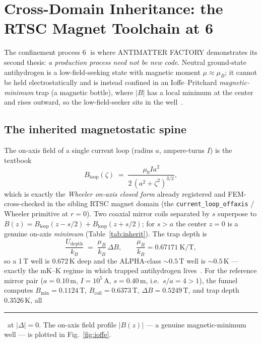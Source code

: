 \documentclass[11pt,a4paper]{article}
\newcommand{\tierdisc}[1]{\textcolor{#1}{\rule[0.05ex]{1.0ex}{1.0ex}}}
\newcommand{\tierGreen}{\tierdisc{green!60!black}}
\begin{document}
\section{Cross-Domain Inheritance: the RTSC Magnet Toolchain at \textcircled{\scriptsize 6}}
\label{sec:inherit}

The confinement process \textcircled{\scriptsize 6} is where ANTIMATTER
FACTORY demonstrates its second thesis: \emph{a production process need not
be new code}. Neutral ground-state antihydrogen is a low-field-seeking state
with magnetic moment $\mu\approx\mu_B$; it cannot be held electrostatically
and is instead confined in an Ioffe--Pritchard \emph{magnetic-minimum}
trap (a magnetic bottle), where $|B|$ has a local minimum at the center and
rises outward, so the low-field-seeker sits in the well~\citep{andresen2010trapped}.

\subsection{The inherited magnetostatic spine}

The on-axis field of a single current loop (radius $a$, ampere-turns $I$) is
the textbook
\begin{equation}
B_{\mathrm{loop}}(\zeta) \;=\; \frac{\mu_0 I a^2}{2\,(a^2+\zeta^2)^{3/2}},
\label{eq:loop}
\end{equation}
which is exactly the \emph{Wheeler on-axis closed form} already registered
and FEM-cross-checked in the sibling RTSC magnet domain (the
\verb|current_loop_offaxis| / Wheeler primitive at $r=0$). Two coaxial
mirror coils separated by $s$ superpose to
$B(z)=B_{\mathrm{loop}}(z-s/2)+B_{\mathrm{loop}}(z+s/2)$; for $s>a$ the
center $z=0$ is a genuine on-axis \emph{minimum} (Table~\ref{tab:inherit}).
The trap depth is
\begin{equation}
\frac{U_{\mathrm{depth}}}{k_B} \;=\; \frac{\mu_B}{k_B}\,\Delta B,
\qquad
\frac{\mu_B}{k_B} = 0.67171\ \mathrm{K/T},
\label{eq:trapdepth}
\end{equation}
so a 1\,T well is $0.672$\,K deep and the ALPHA-class $\sim\!0.5$\,T well is
$\sim\!0.5$\,K --- exactly the mK--K regime in which trapped antihydrogen
lives~\citep{amole2014alphatrap}. For the reference mirror pair
($a=0.10$\,m, $I=10^5$\,A, $s=0.40$\,m, i.e.\ $s/a=4>1$), the funnel computes
$B_{\min}=0.1124$\,T, $B_{\mathrm{coil}}=0.6373$\,T, $\Delta B=0.5249$\,T,
and trap depth $0.3526$\,K, all \tierGreen\ at $|\Delta|=0$. The on-axis
field profile $|B(z)|$ --- a genuine magnetic-minimum well --- is plotted in
Fig.~\ref{fig:ioffe}.
\end{document}
